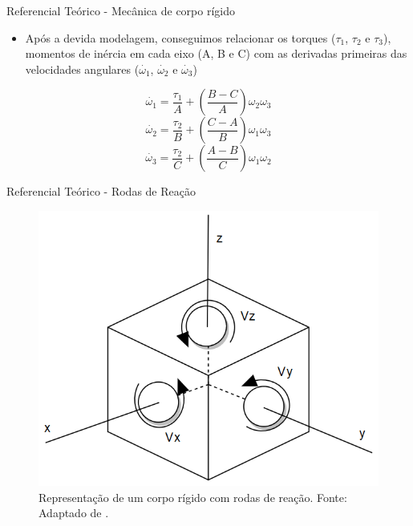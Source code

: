 \documentclass{beamer}
\begin{document}

\begin{frame}{Referencial Teórico - Mecânica de corpo rígido}
	\begin{itemize}
		\justifying
		\item Após a devida modelagem, conseguimos relacionar os torques ($\tau_{1}$, $\tau_{2}$ e $\tau_{3}$), momentos de inércia em cada eixo (A, B e C) com as derivadas primeiras das velocidades angulares ($\dot{\omega_{1}}$, $\dot{\omega_{2}}$ e $\dot{\omega_{3}}$) 
    \end{itemize}

	\begin{equation}
	  \dot{\omega_{1}}=\frac{\tau_{1}}{A}+\left(\frac{B-C}{A}\right)\omega_{2}\omega_{3}
	\end{equation}
	\begin{equation}
	  \dot{\omega_{2}}=\frac{\tau_{2}}{B}+\left(\frac{C-A}{B}\right)\omega_{1}\omega_{3}
	\end{equation}
	\begin{equation}
	  \dot{\omega_{3}}=\frac{\tau_{2}}{C}+\left(\frac{A-B}{C}\right)\omega_{1}\omega_{2}
	\end{equation}
\end{frame}


\begin{frame}{Referencial Teórico - Rodas de Reação}
    \begin{figure}[HT]
		\begin{center}
		\captionsetup{justification=centering}
        \includegraphics[scale=.42]{../referencial/img/satellite_controlhand_p1306}
        \caption{Representação de um corpo rígido com rodas de reação. \newline
        		 Fonte: Adaptado de .}
		\label{FIG_ADAPTATIVO}
        \end{center}
	\end{figure}
\end{frame}
\end{document}

